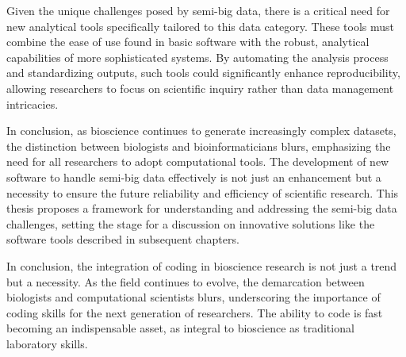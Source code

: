




Given the unique challenges posed by semi-big data, there
is a critical need for new analytical tools specifically tailored to this data
category. These tools must combine the ease of use found in basic software with
the robust, analytical capabilities of more sophisticated systems. By automating
the analysis process and standardizing outputs, such tools could significantly
enhance reproducibility, allowing researchers to focus on scientific inquiry
rather than data management intricacies.


In conclusion, as bioscience continues to generate increasingly complex datasets,
the distinction between biologists and bioinformaticians blurs, emphasizing the
need for all researchers to adopt computational tools. The development of new
software to handle semi-big data effectively is not just an enhancement but a
necessity to ensure the future reliability and efficiency of scientific
research. This thesis proposes a framework for understanding and addressing the
semi-big data challenges, setting the stage for a discussion on innovative
solutions like the software tools described in subsequent chapters.


In conclusion, the integration of coding in bioscience research is not just a
trend but a necessity. As the field continues to evolve, the demarcation between
biologists and computational scientists blurs, underscoring the importance of
coding skills for the next generation of researchers. The ability to code is
fast becoming an indispensable asset, as integral to bioscience as traditional
laboratory skills.




